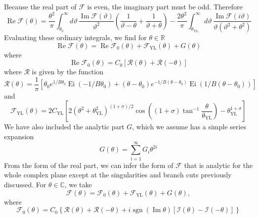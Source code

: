 \documentclass[
aps,
pre,
preprint,
longbibliography,
floatfix
]{revtex4-2}
\begin{document}
Because the real part of $\mathcal F$ is even, the imaginary part must be odd. Therefore
\begin{equation} \label{eq:dispersion}
  \operatorname{Re}\mathcal F(\theta)
  =\frac{\theta^2}{\pi}
  \int_{\theta_0}^\infty d\vartheta\,\frac{\operatorname{Im}\mathcal F(\vartheta)}{\vartheta^2}\left(\frac1{\vartheta-\theta}+\frac1{\vartheta+\theta}\right)
  -\frac{2\theta^2}\pi\int_{\theta_{\mathrm{YL}}}^{\infty}d\vartheta\,\frac{\operatorname{Im}\mathcal F(i\vartheta)}{\vartheta(\vartheta^2+\theta^2)}
\end{equation}
Evaluating these ordinary integrals, we find for $\theta\in\mathbb R$
\begin{equation}
  \operatorname{Re}\mathcal F(\theta)=\operatorname{Re}\mathcal F_0(\theta)+\mathcal F_\mathrm{YL}(\theta)+G(\theta)
\end{equation}
where
\begin{equation} \label{eq:2d.real.Fc}
  \operatorname{Re}\mathcal F_0(\theta)
  =C_0[\mathcal R(\theta)+\mathcal R(-\theta)]
\end{equation}
where $\mathcal R$ is given by the function
\begin{equation}
  \mathcal R(\theta)
  =\frac1\pi\left[
    \theta_0e^{1/B\theta_0}\operatorname{Ei}(-1/B\theta_0)
    +(\theta-\theta_0)e^{-1/B(\theta-\theta_0)}\operatorname{Ei}(1/B(\theta-\theta_0))
  \right]
\end{equation}
and
\begin{equation}
  \mathcal F_{\mathrm{YL}}(\theta)=2C_\mathrm{YL}\left[2(\theta^2+\theta_\mathrm{YL}^2)^{(1+\sigma)/2}\cos\left((1+\sigma)\tan^{-1}\frac\theta{\theta_\mathrm{YL}}\right)-\theta_\mathrm{YL}^{1+\sigma}\right]
\end{equation}
We have also included the analytic part $G$, which we assume has a simple
series expansion
\begin{equation} \label{eq:analytic.free.enery}
  G(\theta)=\sum_{i=1}^\infty G_i\theta^{2i}
\end{equation}
From the form of the real part, we can infer the form of $\mathcal F$ that is
analytic for the whole complex plane except at the singularities and branch
cuts previously discussed.
For $\theta\in\mathbb C$, we take
\begin{equation}
  \mathcal F(\theta)=\mathcal F_0(\theta)+\mathcal F_{\mathrm{YL}}(\theta)+G(\theta),
\end{equation}
where
\begin{equation}
  \mathcal F_0(\theta)=C_0\left\{
    \mathcal R(\theta)+\mathcal R(-\theta)
    +i\operatorname{sgn}(\operatorname{Im}\theta)[\mathcal I(\theta)-\mathcal I(-\theta)]
  \right\}
\end{equation}
\end{document}
